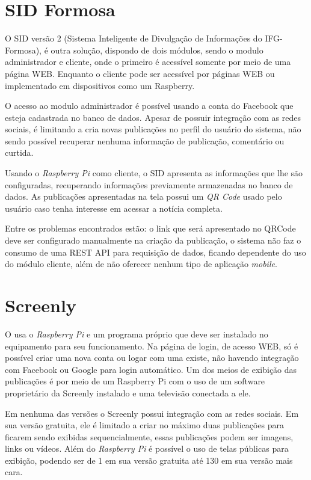\section{SID Formosa}
\label{sec:sid}
O SID versão 2 (Sistema Inteligente de Divulgação de Informações do IFG-Formosa), é outra solução, dispondo de dois módulos, sendo o modulo administrador e cliente, onde o primeiro é acessível somente por meio de uma página WEB. Enquanto o cliente pode ser acessível por páginas WEB ou implementado em dispositivos como um Raspberry.

O acesso ao modulo administrador é possível usando a conta do Facebook que esteja cadastrada no banco de dados. Apesar de possuir integração com as redes sociais, é limitando a cria novas publicações no perfil do usuário do sistema, não sendo possível recuperar nenhuma informação de publicação, comentário ou curtida.

Usando o \textit{Raspberry Pi} como cliente, o SID apresenta as informações que lhe são configuradas, recuperando informações previamente armazenadas no banco de dados. As publicações apresentadas na tela possui um \textit{QR Code} usado pelo usuário caso tenha interesse em acessar a notícia completa. \cite{sobrinho2017}

Entre os problemas encontrados estão: o link que será apresentado no QRCode deve ser configurado manualmente na criação da publicação, o sistema não faz o consumo de uma REST API para requisição de dados, ficando dependente do uso do módulo cliente, além de não oferecer nenhum tipo de aplicação \textit{mobile}.

\section{Screenly}
O \cite{screenly2017} usa o \textit{Raspberry Pi} e um programa próprio que deve ser instalado no equipamento para seu funcionamento. Na página de login, de acesso WEB, só é possível criar uma nova conta ou logar com uma existe, não havendo integração com Facebook ou Google para login automático. Um dos meios de exibição das publicações é por meio de um Raspberry Pi com o uso de um software proprietário da Screenly instalado e uma televisão conectada a ele. 

Em nenhuma das versões o Screenly possui integração com as redes sociais. Em sua versão gratuita, ele é limitado a criar no máximo duas publicações para ficarem sendo exibidas sequencialmente, essas publicações podem ser imagens, links ou vídeos. Além do \textit{Raspberry Pi} é possível o uso de telas públicas para exibição, podendo ser de 1 em sua versão gratuita até 130 em sua versão mais cara.

